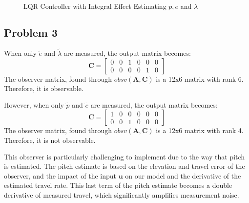 \begin{figure}[p]
  \caption{LQR Controller with Integral Effect Estimating $p, e$ and $\lambda$}
  \label{fig:LQRIntegralEffect_Estimator}
\end{figure}
\restoregeometry

\subsection{Problem 3}
When only $\tilde{e}$ and $\tilde{\lambda}$ are measured, the output
matrix becomes:
%
\begin{equation*}
  \bm{C} =
  \begin{bmatrix}
    0 & 0 & 1 & 0 & 0 & 0 \\
    0 & 0 & 0 & 0 & 1 & 0
  \end{bmatrix}
\end{equation*}
%
The observer matrix, found through $obsv(\bm{A},\bm{C})$ is a 12x6
matrix with rank 6. Therefore, it is observable.

However, when only $\tilde{p}$ and $\tilde{e}$ are measured, the
output matrix becomes:
%
\begin{equation*}
  \bm{C} =
  \begin{bmatrix}
    1 & 0 & 0 & 0 & 0 & 0 \\
    0 & 0 & 1 & 0 & 0 & 0
  \end{bmatrix}
\end{equation*}
%
The observer matrix, found through $obsv(\bm{A},\bm{C})$ is a 12x6
matrix with rank 4. Therefore, it is not observable.

This observer is particularly challenging to implement due to the way that pitch is estimated.  The pitch estimate is based on the elevation and travel error of the observer, and the impact of the input $\bm{u}$ on our model and the derivative of the estimated travel rate.  This last term of the pitch estimate becomes a double derivative of measured travel, which significantly amplifies measurement noise.

